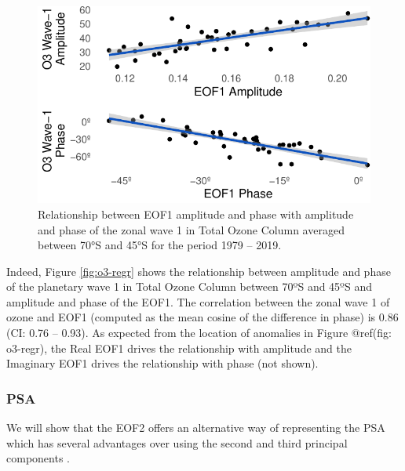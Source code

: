 \documentclass[smallextended]{svjour3}       %
\begin{document}
\begin{figure}
\centering
\includegraphics{../figures/wave1-o3-1.pdf}
\caption{\label{fig:wave1-o3}Relationship between EOF1 amplitude and phase with amplitude and phase of the zonal wave 1 in Total Ozone Column averaged between 70°S and 45°S for the period 1979 -- 2019.}
\end{figure}

Indeed, Figure \ref{fig:o3-regr} shows the relationship between amplitude and phase of the planetary wave 1 in Total Ozone Column between 70ºS and 45ºS and amplitude and phase of the EOF1. The correlation between the zonal wave 1 of ozone and EOF1 (computed as the mean cosine of the difference in phase) is 0.86 (CI: 0.76 -- 0.93). As expected from the location of anomalies in Figure @ref(fig: o3-regr), the Real EOF1 drives the relationship with amplitude and the Imaginary EOF1 drives the relationship with phase (not shown).

\hypertarget{psa}{%
\subsubsection{PSA}\label{psa}}

We will show that the EOF2 offers an alternative way of representing the PSA which has several advantages over using the second and third principal components .
\end{document}
